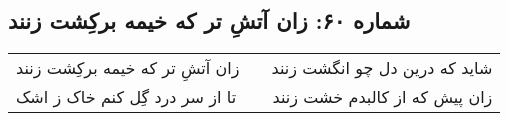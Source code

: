 \begin{center}
\section*{شماره ۶۰: زان آتشِ تر که خیمه برکِشت زنند}
\label{sec:060}
\begin{longtable}{l p{0.5cm} r}
زان آتشِ تر که خیمه برکِشت زنند
&&
شاید که درین دل چو انگشت زنند
\\
تا از سر درد گِل کنم خاک ز اشک
&&
زان پیش که از کالبدم خشت زنند
\\
\end{longtable}
\end{center}
